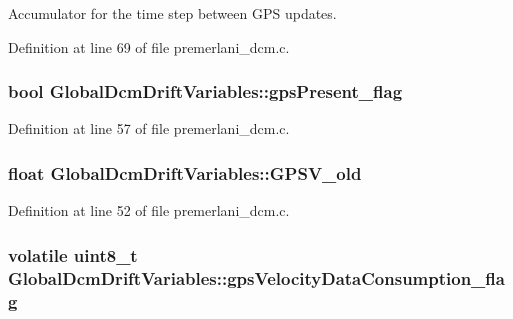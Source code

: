 \-Accumulator for the time step between \-G\-P\-S updates. 



\-Definition at line 69 of file premerlani\-\_\-dcm.\-c.

\hypertarget{struct_global_dcm_drift_variables_ac7e3400f33023d97c131553ebefc9ce8}{
\subsubsection[{gps\-Present\-\_\-flag}]{\setlength{\rightskip}{0pt plus 5cm}bool {\bf \-Global\-Dcm\-Drift\-Variables\-::gps\-Present\-\_\-flag}}}\label{struct_global_dcm_drift_variables_ac7e3400f33023d97c131553ebefc9ce8}


\-Definition at line 57 of file premerlani\-\_\-dcm.\-c.

\hypertarget{struct_global_dcm_drift_variables_afb3e9353cbef8439a6f132ba9af70a3f}{
\subsubsection[{\-G\-P\-S\-V\-\_\-old}]{\setlength{\rightskip}{0pt plus 5cm}float {\bf \-Global\-Dcm\-Drift\-Variables\-::\-G\-P\-S\-V\-\_\-old}}}\label{struct_global_dcm_drift_variables_afb3e9353cbef8439a6f132ba9af70a3f}


\-Definition at line 52 of file premerlani\-\_\-dcm.\-c.

\hypertarget{struct_global_dcm_drift_variables_a27daf6a38cb6e81c64aba4bb8ac9f3fa}{
\subsubsection[{gps\-Velocity\-Data\-Consumption\-\_\-flag}]{\setlength{\rightskip}{0pt plus 5cm}volatile uint8\-\_\-t {\bf \-Global\-Dcm\-Drift\-Variables\-::gps\-Velocity\-Data\-Consumption\-\_\-flag}}}\label{struct_global_dcm_drift_variables_a27daf6a38cb6e81c64aba4bb8ac9f3fa}


